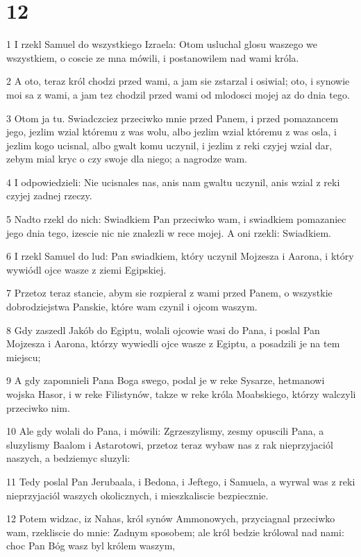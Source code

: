 \chapter{12}

\par 1 I rzekl Samuel do wszystkiego Izraela: Otom usluchal glosu waszego we wszystkiem, o coscie ze mna mówili, i postanowilem nad wami króla.
\par 2 A oto, teraz król chodzi przed wami, a jam sie zstarzal i osiwial; oto, i synowie moi sa z wami, a jam tez chodzil przed wami od mlodosci mojej az do dnia tego.
\par 3 Otom ja tu. Swiadczciez przeciwko mnie przed Panem, i przed pomazancem jego, jezlim wzial któremu z was wolu, albo jezlim wzial któremu z was osla, i jezlim kogo ucisnal, albo gwalt komu uczynil, i jezlim z reki czyjej wzial dar, zebym mial kryc o czy swoje dla niego; a nagrodze wam.
\par 4 I odpowiedzieli: Nie ucisnales nas, anis nam gwaltu uczynil, anis wzial z reki czyjej zadnej rzeczy.
\par 5 Nadto rzekl do nich: Swiadkiem Pan przeciwko wam, i swiadkiem pomazaniec jego dnia tego, izescie nic nie znalezli w rece mojej. A oni rzekli: Swiadkiem.
\par 6 I rzekl Samuel do lud: Pan swiadkiem, który uczynil Mojzesza i Aarona, i który wywiódl ojce wasze z ziemi Egipskiej.
\par 7 Przetoz teraz stancie, abym sie rozpieral z wami przed Panem, o wszystkie dobrodziejstwa Panskie, które wam czynil i ojcom waszym.
\par 8 Gdy zaszedl Jakób do Egiptu, wolali ojcowie wasi do Pana, i poslal Pan Mojzesza i Aarona, którzy wywiedli ojce wasze z Egiptu, a posadzili je na tem miejscu;
\par 9 A gdy zapomnieli Pana Boga swego, podal je w reke Sysarze, hetmanowi wojska Hasor, i w reke Filistynów, takze w reke króla Moabskiego, którzy walczyli przeciwko nim.
\par 10 Ale gdy wolali do Pana, i mówili: Zgrzeszylismy, zesmy opuscili Pana, a sluzylismy Baalom i Astarotowi, przetoz teraz wybaw nas z rak nieprzyjaciól naszych, a bedziemyc sluzyli:
\par 11 Tedy poslal Pan Jerubaala, i Bedona, i Jeftego, i Samuela, a wyrwal was z reki nieprzyjaciól waszych okolicznych, i mieszkaliscie bezpiecznie.
\par 12 Potem widzac, iz Nahas, król synów Ammonowych, przyciagnal przeciwko wam, rzekliscie do mnie: Zadnym sposobem; ale król bedzie królowal nad nami: choc Pan Bóg wasz byl królem waszym,

